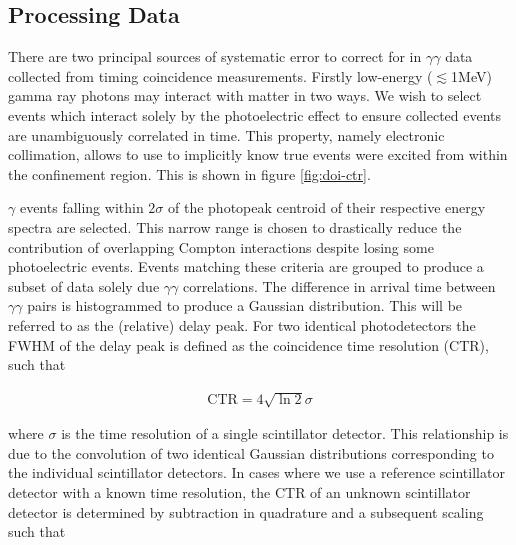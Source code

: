 \subsection{Processing Data}
There are two principal sources of systematic error to correct for in $\gamma\gamma$ data collected from timing coincidence measurements. Firstly low-energy ($\lesssim$1MeV) gamma ray photons may interact with matter in two ways. We wish to select events which interact solely by the photoelectric effect to ensure collected events are unambiguously correlated in time. This property, namely electronic collimation, allows to use to implicitly know true events were excited from within the confinement region. This is shown in figure \ref{fig:doi-ctr}.

$\gamma$ events falling within $2\sigma$ of the photopeak centroid of their respective energy spectra are selected. This narrow range is chosen to drastically reduce the contribution of overlapping Compton interactions despite losing some photoelectric events. Events matching these criteria are grouped to produce a subset of data solely due $\gamma\gamma$ correlations. The difference in arrival time between $\gamma\gamma$ pairs is histogrammed to produce a Gaussian distribution. This will be referred to as the (relative) delay peak. For two identical photodetectors the FWHM of the delay peak is defined as the coincidence time resolution (CTR), such that

\begin{align}
\text{CTR} = 4\sqrt{\ln{2}}\sigma 
\end{align}

where $\sigma$ is the time resolution of a single scintillator detector. This relationship is due to the convolution of two identical Gaussian distributions corresponding to the individual scintillator detectors. In cases where we use a reference scintillator detector with a known time resolution, the CTR of an unknown scintillator detector is determined by subtraction in quadrature and a subsequent scaling such that


